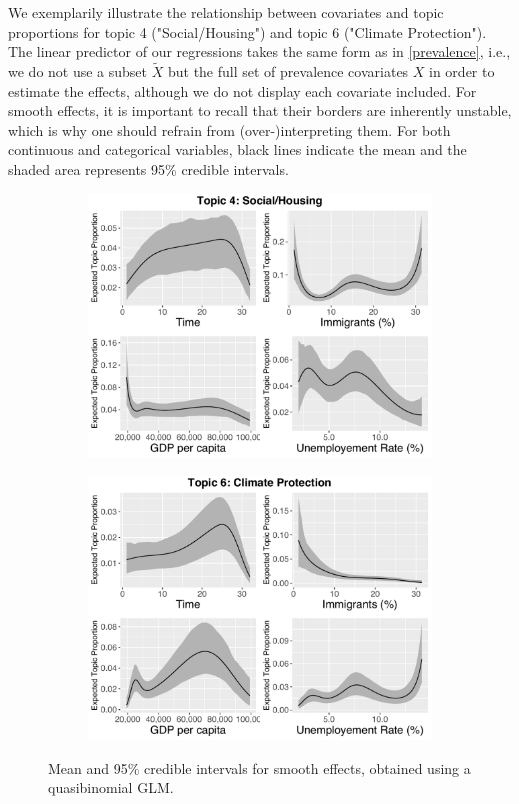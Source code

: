 We exemplarily illustrate the relationship between covariates and topic proportions for topic 4 ("Social/Housing") and topic 6 ("Climate Protection"). The linear predictor of our regressions takes the same form as in  \eqref{prevalence}, i.e., we do not use a subset $\tilde{X}$ but the full set of prevalence covariates $X$ in order to estimate the effects, although we do not display each covariate included. For smooth effects, it is important to recall that their borders are inherently unstable, which is why one should refrain from (over-)interpreting them. For both continuous and categorical variables, black lines indicate the mean and the shaded area represents 95\% credible intervals.

\begin{figure}[h!]
  \centering
  \captionsetup{justification=centering,margin=2cm}
  \begin{subfigure}[b]{0.49\linewidth}
    \includegraphics[width=\linewidth]{../plots/5_1/quasi_t4_cont.pdf}
  \end{subfigure}
  \begin{subfigure}[b]{0.49\linewidth}
    \includegraphics[width=\linewidth]{../plots/5_1/quasi_t6_cont.pdf}
  \end{subfigure}
  \caption{Mean and 95\% credible intervals for smooth effects, obtained using a quasibinomial GLM.}
  \label{fig:coffee}
\end{figure}

